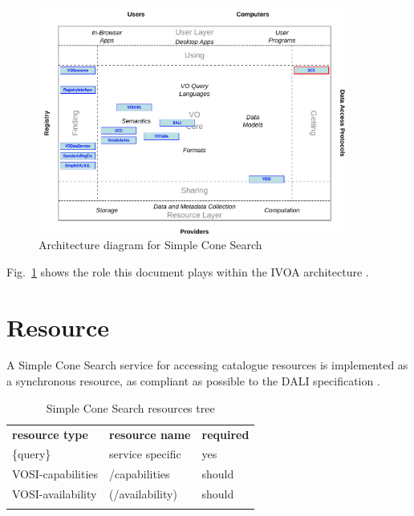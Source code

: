 \documentclass[11pt,a4paper]{ivoa}
\begin{document}
\begin{figure}
\centering


\includegraphics[width=0.9\textwidth]{role_diagram.pdf}
\caption{Architecture diagram for Simple Cone Search}
\label{fig:archdiag}
\end{figure}

Fig.~\ref{fig:archdiag} shows the role this document plays within the
IVOA architecture \citep{note:VOARCH}.

\section{Resource}
\label{sec:resif}

A Simple Cone Search service for accessing catalogue resources is implemented as a
synchronous resource, as compliant as possible to the DALI specification
\citep{std:DALI}.

\begin{table}[th]
\begin{center}
\begin{tabular}{p{}p{}p{}}
\sptablerule
\textbf{resource type}&\textbf{resource name}&\textbf{required}\\
\sptablerule
\{query\} & service specific & yes\\
VOSI-capabilities & /capabilities & should\\
VOSI-availability & (/availability) & should\\
\sptablerule
\label{table:resources}
\end{tabular}
\caption{Simple Cone Search resources tree}
\end{center}
\end{table}
\end{document}

